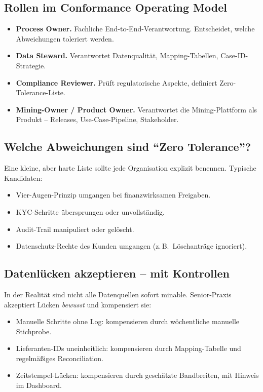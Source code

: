 \documentclass[11pt,a4paper,oneside]{article}
\newcommand{\fachbegriff}[1]{\textbf{#1}}
\begin{document}
\subsection{Rollen im Conformance Operating Model}

\begin{itemize}
  \item \fachbegriff{Process Owner.} Fachliche End-to-End-Verantwortung. Entscheidet, welche Abweichungen toleriert werden.
  \item \fachbegriff{Data Steward.} Verantwortet Datenqualität, Mapping-Tabellen, Case-ID-Strategie.
  \item \fachbegriff{Compliance Reviewer.} Prüft regulatorische Aspekte, definiert Zero-Tolerance-Liste.
  \item \fachbegriff{Mining-Owner / Product Owner.} Verantwortet die Mining-Plattform als Produkt -- Releases, Use-Case-Pipeline, Stakeholder.
\end{itemize}

\subsection{Welche Abweichungen sind ``Zero Tolerance''?}

Eine kleine, aber harte Liste sollte jede Organisation explizit benennen. Typische Kandidaten:

\begin{itemize}
  \item Vier-Augen-Prinzip umgangen bei finanzwirksamen Freigaben.
  \item KYC-Schritte übersprungen oder unvollständig.
  \item Audit-Trail manipuliert oder gelöscht.
  \item Datenschutz-Rechte des Kunden umgangen (z.\,B.\ Löschanträge ignoriert).
\end{itemize}

\subsection{Datenlücken akzeptieren -- mit Kontrollen}

In der Realität sind nicht alle Datenquellen sofort minable. Senior-Praxis akzeptiert Lücken \emph{bewusst} und kompensiert sie:

\begin{itemize}
  \item Manuelle Schritte ohne Log: kompensieren durch wöchentliche manuelle Stichprobe.
  \item Lieferanten-IDs uneinheitlich: kompensieren durch Mapping-Tabelle und regelmäßiges Reconciliation.
  \item Zeitstempel-Lücken: kompensieren durch geschätzte Bandbreiten, mit Hinweis im Dashboard.
\end{itemize}
\end{document}
